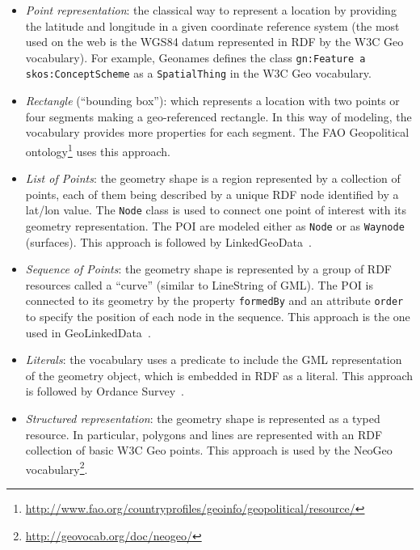 \documentclass[a4paper,11pt]{report}
\begin{document}
\begin{itemize}
  \item \textit{Point representation}: the classical way to represent a location by providing the latitude and longitude in a given coordinate reference system (the most used on the web is the WGS84 datum represented in RDF by the W3C Geo vocabulary). For example, Geonames defines the class \texttt{gn:Feature a skos:ConceptScheme} as a \texttt{SpatialThing} in the W3C Geo vocabulary.
  \item \textit{Rectangle} (``bounding box''): which represents a location with two points or four segments making a geo-referenced rectangle. In this way of modeling, the vocabulary provides more properties for each segment. The FAO Geopolitical ontology\footnote{\url{http://www.fao.org/countryprofiles/geoinfo/geopolitical/resource/}} uses this approach.
  \item \textit{List of Points}: the geometry shape is a region represented by a collection of points, each of them being described by a unique RDF node identified by a lat/lon value. The \texttt{Node} class is used to connect one point of interest with its geometry representation. The POI are modeled either as \texttt{Node} or as \texttt{Waynode} (surfaces). This approach is followed by LinkedGeoData~\cite{linkedgeodata}.
  \item \textit{Sequence of Points}: the geometry shape is represented by a group of RDF resources called a ``curve'' (similar to LineString of GML). The POI is connected to its geometry by the property \texttt{formedBy} and an attribute \texttt{order} to specify the position of each node in the sequence. This approach is the one used in GeoLinkedData~\cite{deLeon2010}.
  \item \textit{Literals}: the vocabulary uses a predicate to include the GML representation of the geometry object, which is embedded in RDF as a literal. This approach is followed by Ordance Survey~\cite{Goodwin2008}.
  \item \textit{Structured representation}: the geometry shape is represented as a typed resource. In particular, polygons and lines are represented with an RDF collection of basic W3C Geo points. This approach is used by the NeoGeo vocabulary\footnote{\url{http://geovocab.org/doc/neogeo/}}.
\end{itemize}

\end{document}
